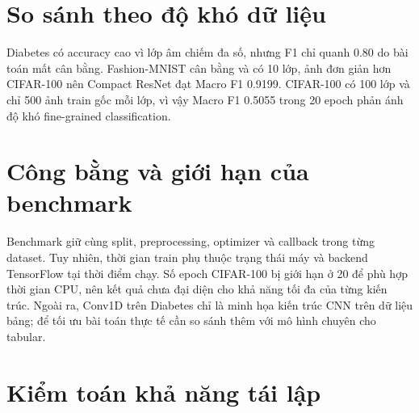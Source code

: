 \documentclass[12pt,a4paper]{report}
\begin{document}
\section{So sánh theo độ khó dữ liệu}
Diabetes có accuracy cao vì lớp âm chiếm đa số, nhưng F1 chỉ quanh 0.80 do bài toán mất cân bằng.
Fashion-MNIST cân bằng và có 10 lớp, ảnh đơn giản hơn CIFAR-100 nên Compact ResNet đạt Macro F1 0.9199.
CIFAR-100 có 100 lớp và chỉ 500 ảnh train gốc mỗi lớp, vì vậy Macro F1 0.5055 trong 20 epoch phản ánh độ khó fine-grained classification.

\section{Công bằng và giới hạn của benchmark}
Benchmark giữ cùng split, preprocessing, optimizer và callback trong từng dataset.
Tuy nhiên, thời gian train phụ thuộc trạng thái máy và backend TensorFlow tại thời điểm chạy.
Số epoch CIFAR-100 bị giới hạn ở 20 để phù hợp thời gian CPU, nên kết quả chưa đại diện cho khả năng tối đa của từng kiến trúc.
Ngoài ra, Conv1D trên Diabetes chỉ là minh họa kiến trúc CNN trên dữ liệu bảng; để tối ưu bài toán thực tế cần so sánh thêm với mô hình chuyên cho tabular.

\section{Kiểm toán khả năng tái lập}
\begin{table}[H]
\centering
\caption{Checklist tái lập Assignment 05}
\label{tab:reproducibility}
\end{table}
\end{document}

